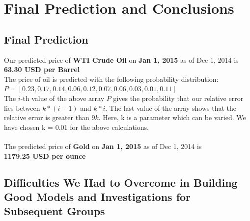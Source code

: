 \documentclass[runningheads]{llncs}
\begin{document}
\newpage
\section{Final Prediction and Conclusions}
\subsection {Final Prediction}
\noindent Our predicted price of \textbf{WTI Crude Oil} on \textbf{Jan 1, 2015} as of Dec 1, 2014 is \\
\textbf{63.30 USD per Barrel} \\

\noindent The price of oil is predicted with the following probability distribution: \\
$P = [0.23, 0.17, 0.14, 0.06, 0.12, 0.07, 0.06, 0.03, 0.01, 0.11]$\\

The $i$-th value of the above array $P$ gives the probability that our relative error lies between $k*(i-1)$ and $k*i$. The last value of the array shows that the relative error is greater than $9k$.
Here, k is a parameter which can be varied. We have chosen k = 0.01 for the above calculations.\\\\

\noindent The predicted price of \textbf{Gold} on \textbf{Jan 1, 2015} as of Dec 1, 2014 is \\
\textbf{1179.25 USD per ounce} \\

\subsection {Difficulties We Had to Overcome in Building Good Models and Investigations for Subsequent Groups}
\end{document}
